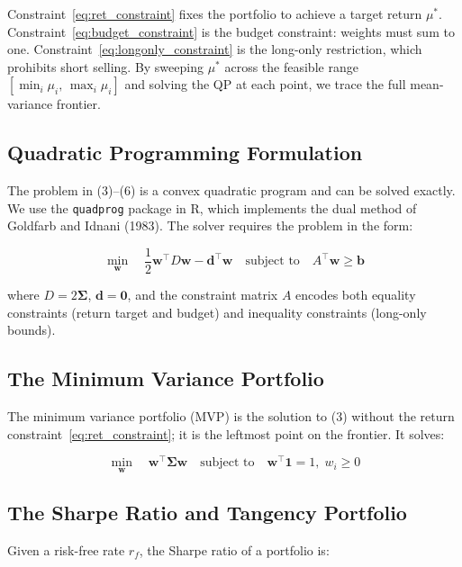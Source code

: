 \documentclass[12pt]{article}
\begin{document}
Constraint~\eqref{eq:ret_constraint} fixes the portfolio to achieve a target
return $\mu^*$. Constraint~\eqref{eq:budget_constraint} is the budget
constraint: weights must sum to one. Constraint~\eqref{eq:longonly_constraint}
is the long-only restriction, which prohibits short selling. By sweeping
$\mu^*$ across the feasible range $[\min_i \mu_i,\, \max_i \mu_i]$ and solving
the QP at each point, we trace the full mean-variance frontier.

\subsection{Quadratic Programming Formulation}

The problem in (3)--(6) is a convex quadratic program and can be solved
exactly. We use the \texttt{quadprog} package in R, which implements the
dual method of Goldfarb and Idnani (1983). The solver requires the problem
in the form:

\begin{equation}
  \min_{\mathbf{w}} \quad \frac{1}{2} \mathbf{w}^\top D \mathbf{w}
  - \mathbf{d}^\top \mathbf{w}
  \quad \text{subject to} \quad A^\top \mathbf{w} \geq \mathbf{b}
\end{equation}

where $D = 2\boldsymbol{\Sigma}$, $\mathbf{d} = \mathbf{0}$, and the
constraint matrix $A$ encodes both equality constraints (return target and
budget) and inequality constraints (long-only bounds).

\subsection{The Minimum Variance Portfolio}

The minimum variance portfolio (MVP) is the solution to (3) without the
return constraint~\eqref{eq:ret_constraint}; it is the leftmost point on
the frontier. It solves:

\begin{equation}
  \min_{\mathbf{w}} \quad \mathbf{w}^\top \boldsymbol{\Sigma} \mathbf{w}
  \quad \text{subject to} \quad \mathbf{w}^\top \mathbf{1} = 1,\;
  w_i \geq 0
\end{equation}

\subsection{The Sharpe Ratio and Tangency Portfolio}

Given a risk-free rate $r_f$, the Sharpe ratio of a portfolio is:
\end{document}
